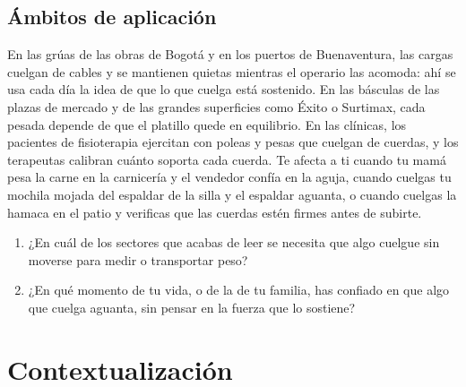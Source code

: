 \documentclass[
  spanish,
  letterpaper,
  12pt,
  oneside,
  open=any,
  DIV=15]{scrbook}
\providecommand{\tightlist}{%
  \setlength{\itemsep}{0pt}\setlength{\parskip}{0pt}}
\newcommand{\setcolorsection}[2]{%
  \definecolor{currentsectionbg}{HTML}{#1}%
  \definecolor{currentsectionborder}{HTML}{#2}%
}
\begin{document}
\subsection{Ámbitos de aplicación}\label{uxe1mbitos-de-aplicaciuxf3n-3}

En las grúas de las obras de Bogotá y en los puertos de Buenaventura,
las cargas cuelgan de cables y se mantienen quietas mientras el operario
las acomoda: ahí se usa cada día la idea de que lo que cuelga está
sostenido. En las básculas de las plazas de mercado y de las grandes
superficies como Éxito o Surtimax, cada pesada depende de que el
platillo quede en equilibrio. En las clínicas, los pacientes de
fisioterapia ejercitan con poleas y pesas que cuelgan de cuerdas, y los
terapeutas calibran cuánto soporta cada cuerda. Te afecta a ti cuando tu
mamá pesa la carne en la carnicería y el vendedor confía en la aguja,
cuando cuelgas tu mochila mojada del espaldar de la silla y el espaldar
aguanta, o cuando cuelgas la hamaca en el patio y verificas que las
cuerdas estén firmes antes de subirte.

\begin{tcolorbox}[enhanced jigsaw, arc=.35mm, bottomrule=.15mm, bottomtitle=1mm, breakable, colback=white, colbacktitle=quarto-callout-note-color!10!white, colframe=quarto-callout-note-color-frame, coltitle=black, left=2mm, leftrule=.75mm, opacityback=0, opacitybacktitle=0.6, rightrule=.15mm, title=\textcolor{quarto-callout-note-color}{\faInfo}\hspace{0.5em}{Conexión con el Mundo Real}, titlerule=0mm, toprule=.15mm, toptitle=1mm]

\begin{enumerate}
\def\labelenumi{\arabic{enumi}.}
\tightlist
\item
  ¿En cuál de los sectores que acabas de leer se necesita que algo
  cuelgue sin moverse para medir o transportar peso?
\item
  ¿En qué momento de tu vida, o de la de tu familia, has confiado en que
  algo que cuelga aguanta, sin pensar en la fuerza que lo sostiene?
\end{enumerate}

\end{tcolorbox}

\setcolorsection{f2c6a0}{e0b088}

\section{Contextualización}\label{contextualizaciuxf3n-3}
\end{document}
